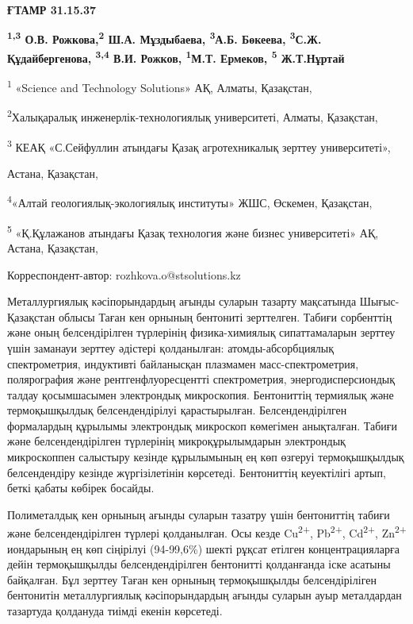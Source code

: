 \newpage
{\bfseries ҒТАМР 31.15.37}


\begin{center}
{\bfseries \textsuperscript{1,3} О.В. Рожкова,\textsuperscript{2} Ш.А. Мұздыбаева, \textsuperscript{3}А.Б. Бөкеева, \textsuperscript{3}С.Ж. Құдайбергенова, \textsuperscript{3,4} В.И. Рожков, \textsuperscript{1}М.Т. Ермеков, \textsuperscript{5} Ж.Т.Нұртай}

\textsuperscript{1} «Science and Technology Solutions» АҚ, Алматы,
Қазақстан,

\textsuperscript{2}Халықаралық инженерлік-технологиялық университеті,
Алматы, Қазақстан,

\textsuperscript{3} КЕАҚ «С.Сейфуллин атындағы Қазақ агротехникалық
зерттеу университеті»,

Астана, Қазақстан,

\textsuperscript{4}«Алтай геологиялық-экологиялық институты» ЖШС,
Өскемен, Қазақстан,

\textsuperscript{5} «Қ.Құлажанов атындағы Қазақ технология және бизнес
университеті» АҚ, Астана, Қазақстан,

Корреспондент-автор: rozhkova.o@stsolutions.kz
\end{center}

Металлургиялық кәсіпорындардың ағынды суларын тазарту мақсатында
Шығыс-Қазақстан облысы Таған кен орнының бентониті зерттелген. Табиғи
сорбенттің және оның белсендірілген түрлерінің физика-химиялық
сипаттамаларын зерттеу үшін заманауи зерттеу әдістері қолданылған:
атомды-абсорбциялық спектрометрия, индуктивті байланысқан плазмамен
масс-спектрометрия, полярография және рентгенфлуоресцентті
спектрометрия, энергодисперсиондық талдау қосымшасымен электрондық
микроскопия. Бентониттің термиялық және термоқышқылдық белсендендірілуі
қарастырылған. Белсендендірілген формалардың құрылымы электрондық
микроскоп көмегімен анықталған. Табиғи және белсендендірілген түрлерінің
микроқұрылымдарын электрондық микроскоппен салыстыру кезінде құрылымының
ең көп өзгеруі термоқышқылдық белсендендіру кезінде жүргізілетінін
көрсетеді. Бентониттің кеуектілігі артып, беткі қабаты көбірек босайды.

Полиметалдық кен орнының ағынды суларын тазатру үшін бентониттің табиғи
және белсендендірілген түрлері қолданылған. Осы кезде
Cu\textsuperscript{2+}, Pb\textsuperscript{2+}, Cd\textsuperscript{2+},
Zn\textsuperscript{2+} иондарының ең көп сіңірілуі (94-99,6\%) шекті
рұқсат етілген концентрацияларға дейін термоқышқылды белсендендірілген
бентонитті қолданғанда іске асатыны байқалған. Бұл зерттеу Таған кен
орнының термоқышқылды белсендіріліген бентонитін металлургиялық
кәсіпорындардың ағынды суларын ауыр металдардан тазартуда қолдануда
тиімді екенін көрсетеді.

